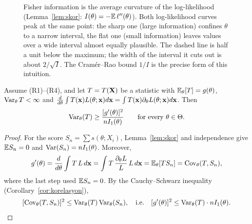 \documentclass[main.tex]{subfiles}
\begin{document}
\begin{figure}[ht]
\caption{Fisher information is the average curvature of the log-likelihood (Lemma~\ref{lem:skor}: $I(\theta)=-\mathbb{E}\,\ell''(\theta)$). Both log-likelihood curves peak at the same point: the sharp one (large information) confines $\theta$ to a narrow interval, the flat one (small information) leaves values over a wide interval almost equally plausible. The dashed line is half a unit below the maximum; the width of the interval it cuts out is about $2/\sqrt{I}$. The Cramér--Rao bound $1/I$ is the precise form of this intuition.}\label{fig:fisher-egrilik}
\end{figure}

\begin{theorem}\label{thm:crlb}
Assume (R1)--(R4), and let $T=T(\mathbf{X})$ be a statistic with $\mathbb{E}_\theta[T] = g(\theta)$, $\operatorname{Var}_\theta T<\infty$ and $\frac{d}{d\theta}\int T(\mathbf{x})L(\theta;\mathbf{x})d\mathbf{x}=\int T(\mathbf{x})\partial_\theta L(\theta;\mathbf{x})d\mathbf{x}$. Then
\[
\operatorname{Var}_\theta(T) \ge \frac{[g'(\theta)]^2}{n I_1(\theta)}\qquad\text{for every }\theta\in\Theta.
\]
\end{theorem}
\begin{proof}
For the score $S_n=\sum s(\theta;X_i)$, Lemma~\ref{lem:skor} and independence give $\mathbb{E} S_n=0$ and $\operatorname{Var}(S_n) = n I_1(\theta)$. Moreover,
\[
g'(\theta)=\frac{d}{d\theta}\int T\,L\,d\mathbf{x}=\int T\,\frac{\partial_\theta L}{L}\,L\,d\mathbf{x}=\mathbb{E}_\theta[T S_n]=\operatorname{Cov}_\theta(T,S_n),
\]
where the last step used $\mathbb{E} S_n=0$. By the Cauchy--Schwarz inequality (Corollary~\ref{cor:korelasyon}),
\[
[\operatorname{Cov}_\theta(T, S_n)]^2 \le \operatorname{Var}_\theta(T)\operatorname{Var}_\theta(S_n),\quad\text{i.e.}\quad [g'(\theta)]^2\le\operatorname{Var}_\theta(T)\cdot nI_1(\theta). \qedhere
\]
\end{proof}
\end{document}
